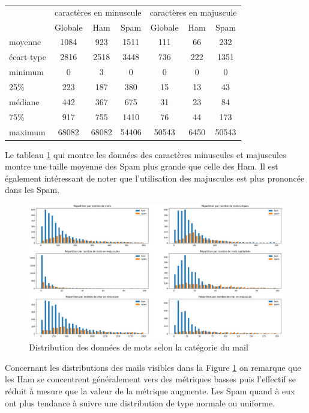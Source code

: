 \documentclass[a4paper,12pt]{article}
\begin{document}
				\begin{table}[H]
					\centering
					 \label{tab:schar}
					\begin{tabular}{|l|c|c|c|c|c|c|}
						\hline
									& \multicolumn{3}{|c|}{caractères en minuscule} & \multicolumn{3}{|c|}{caractères en majuscule}\\
									& Globale	& Ham 	& Spam 	& Globale	& Ham	& Spam	\\
						\hline
						moyenne		& 1084		& 923	& 1511	& 111		& 66		& 232	\\
						\hline
						écart-type	& 2816		& 2518	& 3448	& 736		& 222	& 1351	\\
						\hline
						minimum		& 0			& 3		& 0		& 0			& 0		& 0		\\
						\hline
						25\%			& 223		& 187	& 380	& 15			& 13		& 43		\\
						\hline
						médiane		& 442		& 367	& 675	& 31			& 23		& 84		\\
						\hline
						75\%			& 917		& 755	& 1410	& 76			& 44		& 173	\\
						\hline
						maximum		& 68082		& 68082	& 54406	& 50543		& 6450	& 50543	\\
						\hline
						
					\end{tabular}
				\end{table}
				Le tableau \ref{tab:schar} qui montre les données des caractères minuscules et majuscules montre une taille moyenne des Spam plus grande que celle des Ham. Il est également intéressant de noter que l'utilisation des majuscules est plus prononcée dans les Spam.
				\begin{figure}[H]
					\includegraphics[width=\linewidth]{img/p2mots.png}
					\caption{Distribution des données de mots selon la catégorie du mail}
					\label{fig:p2mots}
				\end{figure}
				Concernant les distributions des mails visibles dans la Figure \ref{fig:p2mots} on remarque que les Ham se concentrent généralement vers des métriques basses puis l'effectif se réduit à mesure que la valeur de la métrique augmente. Les Spam quand à eux ont plus tendance à suivre une distribution de type normale ou uniforme.
				
\end{document}
